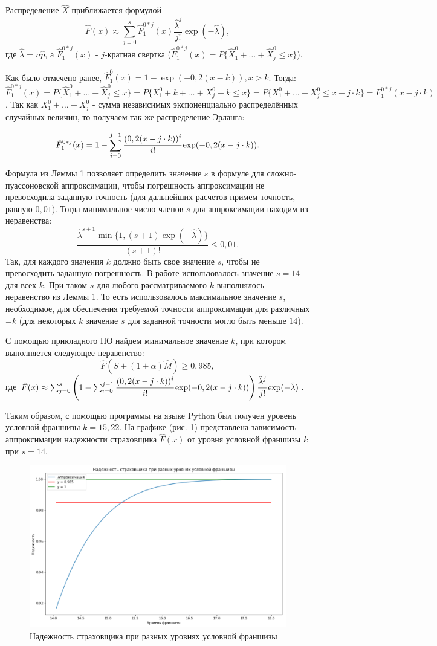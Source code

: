 \documentclass[a4paper,12pt]{article}
\begin{document}
Распределение $\hat{X}$ приближается формулой 
\[\hat{F}(x) \approx \sum_{j = 0}^{s} \hat{F}_1^{0 * j}(x) \frac{\hat{\lambda}^j}{j!}\exp (-\hat{\lambda}),\]
где $\hat{\lambda} = n\hat{p}$, а $\hat{F}_1^{0 * j}(x)$ - $j$-кратная свертка ($\hat{F}_1^{0 * j}(x) = P\{\hat{X}_1^0 + \dots + \hat{X}_j^0 \le x\}$).

Как было отмечено ранее, $\hat{F}_1^0(x) = 1-\exp(-0,2(x-k)), x>k$. Тогда: $\hat{F}_1^{0 * j}(x) = P\{\hat{X}_1^0 + \dots + \hat{X}_j^0 \le x\}=P\{X_1^0+k+\dots + X_j^0+k\le x\}=P\{X_1^0+\dots + X_j^0\le x - j\cdot k\}={F}_1^{0 * j}(x-j\cdot k)$. Так как $X_1^0+\dots + X_j^0$ - сумма независимых экспоненциально распределённых случайных величин, то получаем так же распределение Эрланга:

\[\hat{F}_1^{0 * j}(x) = 1 - \sum_{i = 0}^{j - 1} \cfrac{(0,2(x-j\cdot k))^i}{i!} \exp(-0,2(x-j\cdot k)).\]

Формула из Леммы 1 позволяет определить значение $s$ в формуле для сложно-пуассоновской аппроксимации, чтобы погрешность аппроксимации не превосходила заданную точность (для дальнейших расчетов примем точность, равную $0,01$). Тогда минимальное число членов $s$ для аппроксимации находим из неравенства:
\[\frac{\hat{\lambda}^{s + 1} \min\{1, (s + 1)\exp(-\hat{\lambda})\}}{(s + 1)!} \le 0,01.\]
Так, для каждого значения $k$ должно быть свое значение $s$, чтобы не превосходить заданную погрешность. В работе использовалось значение $s = 14$ для всех $k$. При таком $s$ для любого рассматриваемого $k$ выполнялось неравенство из Леммы 1. То есть использовалось максимальное значение $s$, необходимое, для обеспечения требуемой точности аппроксимации для различных =$k$ (для некоторых $k$ значение $s$ для заданной точности могло быть меньше $14$).

С помощью прикладного ПО найдем минимальное значение $k$, при котором выполняется следующее неравенство:
\[\hat{F}(S + (1 + \alpha)\hat{M}) \ge 0,985,\]
где $\hat{F}(x) \approx \sum_{j = 0}^{s} \left(1 - \sum_{i = 0}^{j - 1} \cfrac{(0,2(x-j\cdot k))^i}{i!} \exp(-0,2(x-j\cdot k))\right) \cfrac{\hat{\lambda}^j}{j!}\exp (-\hat{\lambda})$.

Таким образом, с помощью программы на языке Python был получен уровень условной франшизы $k=15,22$. На графике (рис. \ref{fig:graph2}) представлена зависимость аппроксимации надежности страховщика $\hat{F}(x)$ от уровня условной франшизы $k$ при $s = 14$.

\begin{figure}[H]
	\centering
	\includegraphics[width=0.9\linewidth]{graph2}
	\caption{Надежность страховщика при разных уровнях условной франшизы}
	\label{fig:graph2}
\end{figure}
\end{document}
